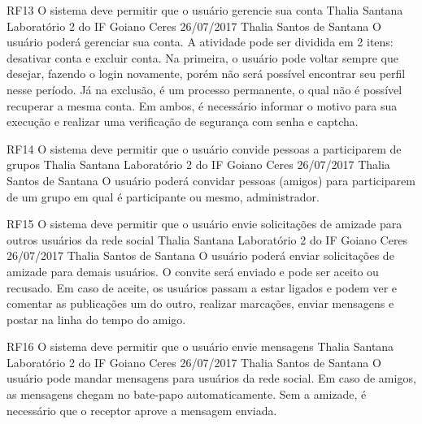 \documentclass[versao=digital]{ifgoiano_ceres_tc_v2}
\begin{document}
\requisitoFuncional
{RF13}
{O sistema deve permitir que o usuário gerencie sua conta}
{Thalia Santana}
{Laboratório 2 do IF Goiano Ceres}
{26/07/2017}
{Thalia Santos de Santana}
{O usuário poderá gerenciar sua conta. A atividade pode ser dividida em 2 itens: desativar conta e excluir conta. Na primeira, o usuário pode voltar sempre que desejar, fazendo o login novamente, porém não será possível encontrar seu perfil nesse período. Já na exclusão, é um processo permanente,  o qual não é possível recuperar a mesma conta. Em ambos, é necessário informar o motivo para sua execução e realizar uma verificação de segurança com  senha e captcha.  
}

\requisitoFuncional
{RF14}
{O sistema deve permitir que o usuário convide pessoas a participarem de grupos}
{Thalia Santana}
{Laboratório 2 do IF Goiano Ceres}
{26/07/2017}
{Thalia Santos de Santana}
{O usuário poderá convidar pessoas (amigos) para participarem de um grupo em qual é participante ou mesmo, administrador.
}

\requisitoFuncional
{RF15}
{O sistema deve permitir que o usuário envie solicitações de amizade para outros usuários da rede social}
{Thalia Santana}
{Laboratório 2 do IF Goiano Ceres}
{26/07/2017}
{Thalia Santos de Santana}
{O usuário poderá enviar solicitações de amizade para demais usuários. O convite será enviado e pode ser aceito ou recusado.  Em caso de aceite, os usuários passam a estar ligados e podem ver e comentar as publicações um do outro, realizar marcações, enviar mensagens e postar na linha do tempo do amigo.
}

\requisitoFuncional
{RF16}
{O sistema deve permitir que o  usuário envie mensagens}
{Thalia Santana}
{Laboratório 2 do IF Goiano Ceres}
{26/07/2017}
{Thalia Santos de Santana}
{O usuário pode mandar mensagens para usuários da rede social. Em caso de amigos, as mensagens chegam no bate-papo automaticamente. Sem a amizade, é necessário que o receptor aprove a mensagem enviada.
}
\end{document}
